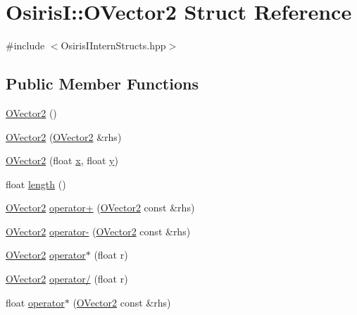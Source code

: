 \hypertarget{struct_osiris_i_1_1_o_vector2}{\section{Osiris\-I\-:\-:O\-Vector2 Struct Reference}
\label{struct_osiris_i_1_1_o_vector2}
}


{\ttfamily \#include $<$Osiris\-I\-Intern\-Structs.\-hpp$>$}

\subsection*{Public Member Functions}
\begin{DoxyCompactItemize}
\item 
\hyperlink{struct_osiris_i_1_1_o_vector2_a8e9cba07daecd57d8d50e8dfa559ab09}{O\-Vector2} ()
\item 
\hyperlink{struct_osiris_i_1_1_o_vector2_a1126a15685a35e7b7e15255b94e2b72b}{O\-Vector2} (\hyperlink{struct_osiris_i_1_1_o_vector2}{O\-Vector2} \&rhs)
\item 
\hyperlink{struct_osiris_i_1_1_o_vector2_ad310757ebd44bca2b1ccaed7d4421f6e}{O\-Vector2} (float \hyperlink{struct_osiris_i_1_1_o_vector2_a84f3e40c0b1cd8b79708a5a90132f47a}{x}, float \hyperlink{struct_osiris_i_1_1_o_vector2_a8cee2693858779af0e001978c270a07b}{y})
\item 
float \hyperlink{struct_osiris_i_1_1_o_vector2_ab395260257030d03635f599f4a48452f}{length} ()
\item 
\hyperlink{struct_osiris_i_1_1_o_vector2}{O\-Vector2} \hyperlink{struct_osiris_i_1_1_o_vector2_af0be340f017f54ff1cafdc0b6115bc47}{operator+} (\hyperlink{struct_osiris_i_1_1_o_vector2}{O\-Vector2} const \&rhs)
\item 
\hyperlink{struct_osiris_i_1_1_o_vector2}{O\-Vector2} \hyperlink{struct_osiris_i_1_1_o_vector2_a4a71dc073434a315e28db311d1cdbabf}{operator-\/} (\hyperlink{struct_osiris_i_1_1_o_vector2}{O\-Vector2} const \&rhs)
\item 
\hyperlink{struct_osiris_i_1_1_o_vector2}{O\-Vector2} \hyperlink{struct_osiris_i_1_1_o_vector2_ab140526b12d3fef185cc3fcd550d94c2}{operator$\ast$} (float r)
\item 
\hyperlink{struct_osiris_i_1_1_o_vector2}{O\-Vector2} \hyperlink{struct_osiris_i_1_1_o_vector2_a1cc055064aae31a379b7536597301794}{operator/} (float r)
\item 
float \hyperlink{struct_osiris_i_1_1_o_vector2_adf24729f3dd8546317a37e851f661cb4}{operator$\ast$} (\hyperlink{struct_osiris_i_1_1_o_vector2}{O\-Vector2} const \&rhs)

\end{DoxyCompactItemize}
